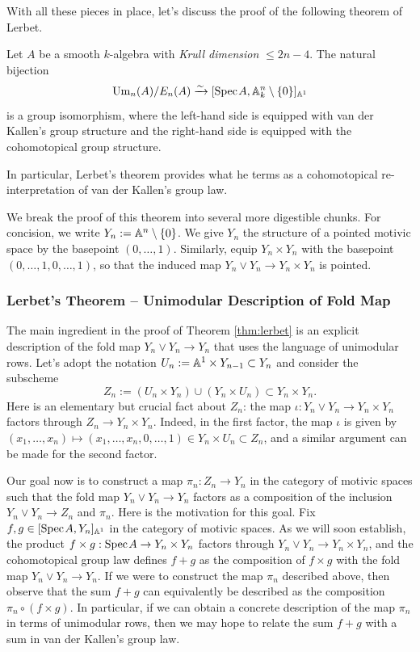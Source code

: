 With all these pieces in place, let's discuss the proof of the following theorem of Lerbet.

\begin{theorem}[Lerbet, 2024]\label{thm:lerbet}
    Let $A$ be a smooth $k$-algebra with \textit{Krull dimension} $\leq 2n-4$. The natural bijection
    \[
    \mathrm{Um}_n(A)/E_n(A) \xrightarrow{\sim} [\text{Spec}\hspace{0.1em} A, \mathbb{A}^n_k\setminus\{0\}]_{\mathbb{A}^1}
    \]
    is a group isomorphism, where the left-hand side is equipped with van der Kallen's group structure and the right-hand side is equipped with the cohomotopical group structure. 
\end{theorem}

In particular, Lerbet's theorem provides what he terms as a cohomotopical re-interpretation of van der Kallen's group law. 

We break the proof of this theorem into several more digestible chunks. For concision, we write $Y_n := \mathbb{A}^n \setminus\{0\}$. We give $Y_n$ the structure of a pointed motivic space by the basepoint $(0,\ldots,1)$. Similarly, equip $Y_n \times Y_n$ with the basepoint $(0,\ldots,1,0,\ldots,1)$, so that the induced map $Y_n \vee Y_n \to Y_n \times Y_n$ is pointed. 

\subsubsection{Lerbet's Theorem -- Unimodular Description of Fold Map}\label{subsec:lerbet_unimodular}

The main ingredient in the proof of Theorem \ref{thm:lerbet} is an explicit description of the fold map $Y_n \vee Y_n \to Y_n$ that uses the language of unimodular rows. Let's adopt the notation $U_n := \mathbb{A}^1 \times Y_{n-1} \subset Y_n$ and consider the subscheme
\[
Z_n := (U_n \times Y_n) \cup (Y_n  \times U_n)\subset Y_n \times Y_n.
\]
Here is an elementary but crucial fact about $Z_n$: the map $\iota: Y_n \vee Y_n \to Y_n \times Y_n$ factors through $Z_n \to Y_n \times Y_n$. Indeed, in the first factor, the map $\iota$ is given by $(x_1,\ldots,x_n) \mapsto (x_1,\ldots,x_n,0,\ldots,1) \in Y_n \times U_n \subset Z_n$, and a similar argument can be made for the second factor. 

Our goal now is to construct a map $\pi_n: Z_n \to Y_n$ in the category of motivic spaces such that the fold map $Y_n \vee Y_n \to Y_n$ factors as a composition of the inclusion $Y_n \vee Y_n \to Z_n$ and $\pi_n$. Here is the motivation for this goal. Fix $f,g \in [\text{Spec}\hspace{0.1em} A, Y_n]_{\mathbb{A}^1}$ in the category of motivic spaces. As we will soon establish, the product $f \times g: \text{Spec}\hspace{0.1em} A \to Y_n \times Y_n$ factors through $Y_n \vee Y_n \to Y_n \times Y_n$, and the cohomotopical group law defines $f + g$ as the composition of $f \times g$ with the fold map $Y_n \vee Y_n \to Y_n$. If we were to construct the map $\pi_n$ described above, then observe that the sum $f + g$ can equivalently be described as the composition $\pi_{n} \circ (f \times g)$. In particular, if we can obtain a concrete description of the map $\pi_n$ in terms of unimodular rows, then we may hope to relate the sum $f + g$ with a sum in van der Kallen's group law. 

